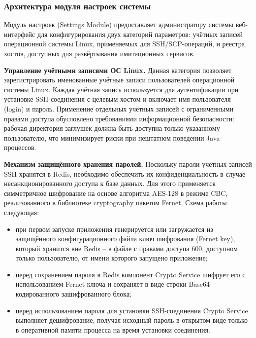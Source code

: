 \documentclass[
]{article}
\begin{document}
\subsubsection{Архитектура модуля настроек
системы}\label{ux430ux440ux445ux438ux442ux435ux43aux442ux443ux440ux430-ux43cux43eux434ux443ux43bux44f-ux43dux430ux441ux442ux440ux43eux435ux43a-ux441ux438ux441ux442ux435ux43cux44b}

Модуль настроек (Settings Module) предоставляет администратору системы
веб-интерфейс для конфигурирования двух категорий параметров: учётных
записей операционной системы Linux, применяемых для SSH/SCP-операций, и
реестра хостов, доступных для развёртывания имитационных сервисов.

\textbf{Управление учётными записями ОС Linux.} Данная категория
позволяет зарегистрировать именованные учётные записи пользователей
операционной системы Linux. Каждая учётная запись используется для
аутентификации при установке SSH-соединения с целевым хостом и включает
имя пользователя (login) и пароль. Применение отдельных учётных записей
с ограниченными правами доступа обусловлено требованиями информационной
безопасности: рабочая директория заглушек должна быть доступна только
указанному пользователю, что минимизирует риски при нештатном поведении
Java-процессов.

\textbf{Механизм защищённого хранения паролей.} Поскольку пароли учётных
записей SSH хранятся в Redis, необходимо обеспечить их
конфиденциальность в случае несанкционированного доступа к базе данных.
Для этого применяется симметричное шифрование на основе алгоритма
AES-128 в режиме CBC, реализованного в библиотеке cryptography пакетом
Fernet. Схема работы следующая:

\begin{itemize}
\item
  при первом запуске приложения генерируется или загружается из
  защищённого конфигурационного файла ключ шифрования (Fernet key),
  который хранится вне Redis -- в файле с правами доступа 600, доступном
  только пользователю, от имени которого запущено приложение;
\item
  перед сохранением пароля в Redis компонент Crypto Service шифрует его
  с использованием Fernet-ключа и сохраняет в виде строки
  Base64-кодированного зашифрованного блока;
\item
  перед использованием пароля для установки SSH-соединения Crypto
  Service выполняет дешифрование, получая исходный пароль в открытом
  виде только в оперативной памяти процесса на время установки
  соединения.
\end{itemize}
\end{document}
